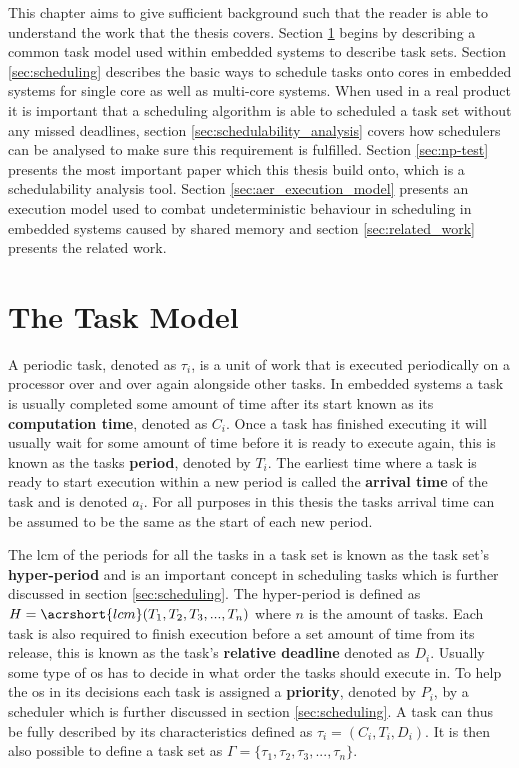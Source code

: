 \documentclass{kththesis}
\begin{document}
This chapter aims to give sufficient background such that the reader is able to understand the work
that the thesis covers. Section \ref{sec:the_task_model} begins by describing a common task model
used within embedded systems to describe task sets. Section \ref{sec:scheduling} describes the basic
ways to schedule tasks onto cores in embedded systems for single core as well as multi-core systems.
When used in a real product it is important that a scheduling algorithm is able to scheduled a task
set without any missed deadlines, section \ref{sec:schedulability_analysis} covers how schedulers
can be analysed to make sure this requirement is fulfilled. Section \ref{sec:np-test} presents the
most important paper which this thesis build onto, which is a schedulability analysis tool. Section
\ref{sec:aer_execution_model} presents an execution model used to combat undeterministic behaviour
in scheduling in embedded systems caused by shared memory and section \ref{sec:related_work}
presents the related work.


\section{The Task Model} \label{sec:the_task_model}

A periodic task, denoted as $\tau_i$, is a unit of work that is executed periodically on a processor
over and over again alongside other tasks. In embedded systems a task is usually completed some
amount of time after its start known as its \textbf{computation time}, denoted as $C_i$. Once a task
has finished executing it will usually wait for some amount of time before it is ready to execute
again, this is known as the tasks \textbf{period}, denoted by $T_i$. The earliest time where a task
is ready to start execution within a new period is called the \textbf{arrival time} of the task and
is denoted $ a_i $.  For all purposes in this thesis the tasks arrival time can be assumed to be the
same as the start of each new period.

The \acrshort{lcm} of the periods for all the tasks in a task set is known as the task set's
\textbf{hyper-period} and is an important concept in scheduling tasks which is further discussed
in section \ref{sec:scheduling}. The hyper-period is defined as $H = \acrshort{lcm}(T_1, T_2, T_3,
..., T_n)$ where $n$ is the amount of tasks. Each task is also required to finish execution before a
set amount of time from its release, this is known as the task's \textbf{relative deadline} denoted
as $D_i$. Usually some type of \acrshort{os} has to decide in what order the tasks should execute
in. To help the \acrshort{os} in its decisions each task is assigned a \textbf{priority}, denoted by
$P_i$, by a scheduler which is further discussed in section \ref{sec:scheduling}. A task can thus
be fully described by its characteristics defined as $\tau_i = (C_i, T_i, D_i)$. It is then also
possible to define a task set as $ \Gamma = \{\tau_1, \tau_2, \tau_3, ..., \tau_n\} $. 
\end{document}
